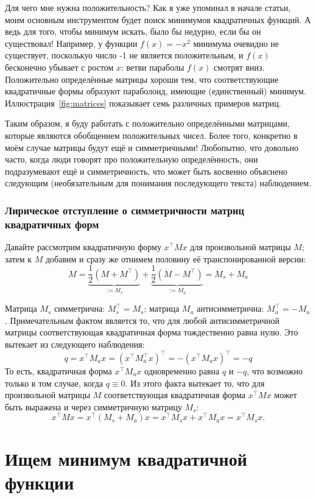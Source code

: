 \documentclass[notitlepage]{report}
\begin{document}
Для чего мне нужна положительность? Как я уже упоминал в начале статьи, моим основным инструментом
будет поиск минимумов квадратичных функций. А ведь для того, чтобы минимум искать, было бы недурно, если бы он существовал! Например, у функции $f(x) = - x^2$ минимума очевидно не существует, посколькуо число -1 не является положительным, и $f(x)$ бесконечно убывает с ростом $x$: ветви параболы $f(x)$ смотрят вниз.
Положительно определённые матрицы хороши тем, что соответствующие квадратичные формы образуют параболоид, имеющие (единственный) минимум. Иллюстрация~\ref{fig:matrices} показывает семь различных примеров матриц.

Таким образом, я буду работать с положительно определёнными матрицами, которые являются обобщением положительных чисел. Более того, конкретно в моём случае матрицы будут ещё и симметричными!
Любопытно, что довольно часто, когда люди говорят про положительную определённость, они подразумевают ещё и симметричность, что может быть косвенно объяснено следующим (необязательным для понимания последующего текста) наблюдением.

\subsubsection{Лирическое отступление о симметричности матриц квадратичных форм}

Давайте рассмотрим квадратичную форму $x^\top M x$ для произвольной матрицы $M$; затем
к $M$ добавим и сразу же отнимем половину её транспонированной версии:
$$
M = \underbrace{\frac{1}{2} (M+M^\top)}_{:=M_s} + \underbrace{\frac{1}{2} (M-M^\top)}_{:=M_a} = M_s + M_a
$$

Матрица $M_s$ симметрична: $M_s^\top = M_s$; матрица $M_a$ антисимметрична: $M_a^\top=-M_a$.
Примечательным фактом является то, что для любой антисимметричной матрицы соответствующая квадратичная форма тождественно равна нулю. Это вытекает из следующего наблюдения:
$$
q = x^\top M_a x  = (x^\top M_a^\top x)^\top = - (x^\top M_a x)^\top = -q
$$
То есть, квадратичная форма $x^\top M_a x$ одновременно равна $q$ и $-q$, что возможно только в том случае, когда $q\equiv 0$.
Из этого факта вытекает то, что для произвольной матрицы $M$ соответствующая  квадратичная форма $x^\top M x$ может быть выражена и через симметричную матрицу $M_s$:
$$
x^\top M x = x^\top (M_s + M_a) x = x^\top M_s x  + x^\top M_a x = x^\top M_s x.
$$


\section{Ищем минимум квадратичной функции}
\end{document}
